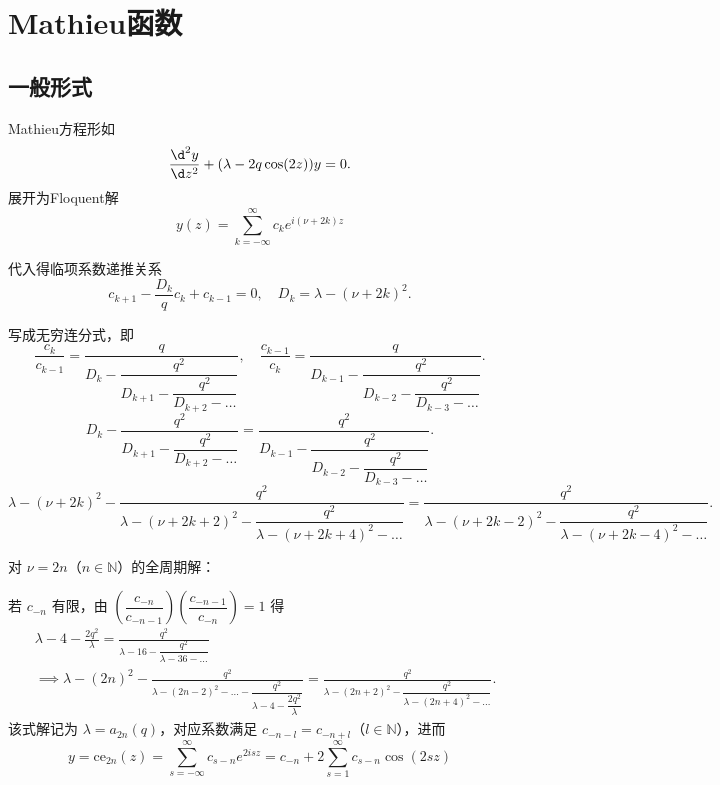 \newpage
\section{Mathieu函数}
\subsection{一般形式}
Mathieu方程形如
\begin{equation*}
	\frac{\d^2 y}{\d z^2} + (\lambda - 2q \cos(2z)) y = 0.
\end{equation*}
展开为Floquent解
\begin{equation*}
	y(z) = \sum_{k=-\infty}^{\infty} c_k e^{i(\nu + 2k)z}
\end{equation*}

代入得临项系数递推关系
\begin{equation*}
	c_{k+1} - \frac{D_k}{q} c_k + c_{k-1} = 0, \quad D_k = \lambda - (\nu + 2k)^2.
\end{equation*}

写成无穷连分式，即
\begin{equation*}
	\frac{c_k}{c_{k-1}} = \frac{q}{D_k - \dfrac{q^2}{D_{k+1} - \dfrac{q^2}{D_{k+2} - \dots}}}, \quad \frac{c_{k-1}}{c_k} = \frac{q}{D_{k-1} - \dfrac{q^2}{D_{k-2} - \dfrac{q^2}{D_{k-3} - \dots}}}.
\end{equation*}
\begin{equation*}
	D_k - \frac{q^2}{D_{k+1} - \dfrac{q^2}{D_{k+2} - \dots}} = \frac{q^2}{D_{k-1} - \dfrac{q^2}{D_{k-2} - \dfrac{q^2}{D_{k-3} - \dots}}}.
\end{equation*}
\begin{equation*}
	\lambda - (\nu + 2k)^2 - \frac{q^2}{\lambda - (\nu + 2k + 2)^2 - \dfrac{q^2}{\lambda - (\nu + 2k + 4)^2 - \dots}} = \frac{q^2}{\lambda - (\nu + 2k - 2)^2 - \dfrac{q^2}{\lambda - (\nu + 2k - 4)^2 - \dots}}.
\end{equation*}

对 \(\nu = 2n\)（\(n \in \mathbb{N}\)）的全周期解：

若 \(c_{-n}\) 有限，由 \(\left( \dfrac{c_{-n}}{c_{-n-1}} \right) \left( \dfrac{c_{-n-1}}{c_{-n}} \right) = 1\) 得
\begin{align*}
	 & \lambda - 4 - \frac{2q^2}{\lambda} = \frac{q^2}{\lambda - 16 - \dfrac{q^2}{\lambda - 36 - \dots}}                                                                                                       \\
	 & \implies \lambda - (2n)^2 - \frac{q^2}{\lambda - (2n - 2)^2 - \dots - \dfrac{q^2}{\lambda - 4 - \dfrac{2q^2}{\lambda}}} = \frac{q^2}{\lambda - (2n + 2)^2 - \dfrac{q^2}{\lambda - (2n + 4)^2 - \dots}}.
\end{align*}
该式解记为 \(\lambda = a_{2n}(q)\)，对应系数满足 \(c_{-n-l} = c_{-n+l}\)（\(l \in \mathbb{N}\)），进而
\begin{equation*}
	y = \mathrm{ce}_{2n}(z) = \sum_{s=-\infty}^{\infty} c_{s-n} e^{2isz} = c_{-n} + 2 \sum_{s=1}^{\infty} c_{s-n} \cos(2sz)
\end{equation*}

